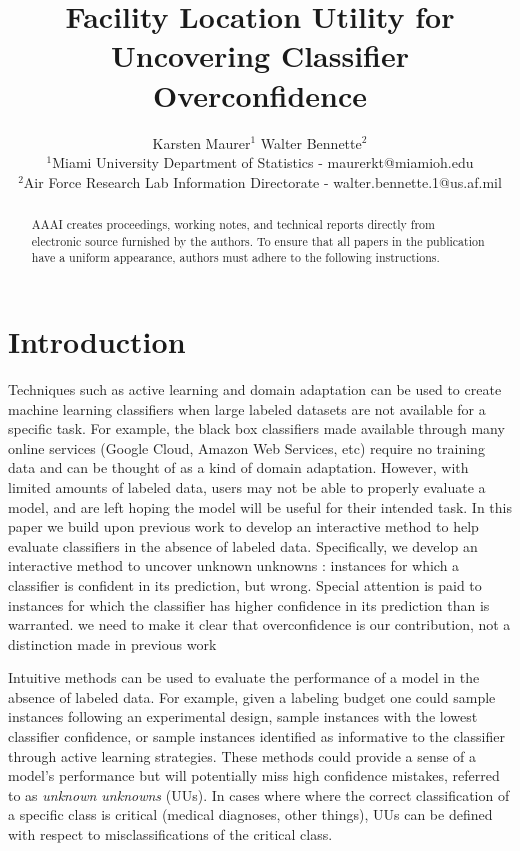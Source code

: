 \documentclass[letterpaper]{article} %
\newcommand{\km}[1]{{\color{red} #1}} %
\begin{document}
%
\title{Facility Location Utility for Uncovering Classifier Overconfidence}
\author{Karsten Maurer$^1$ \hspace{.2in} Walter Bennette$^2$\\
$^1$Miami University Department of Statistics - maurerkt@miamioh.edu\\ 
$^2$Air Force Research Lab Information Directorate - walter.bennette.1@us.af.mil \\
}

\maketitle
\begin{abstract}
AAAI creates proceedings, working notes, and technical reports directly from electronic source furnished by the authors. To ensure that all papers in the publication have a uniform appearance, authors must adhere to the following instructions. 
\end{abstract}

\section{Introduction}

Techniques such as active learning \citep{Settles2010} and domain adaptation \citep{Patel2014} can be used to create machine learning classifiers when large labeled datasets are not available for a specific task.  For example, the black box classifiers made available through many online services (Google Cloud, Amazon Web Services, etc) require no training data and can be thought of as a kind of domain adaptation.  However, with limited amounts of labeled data, users may not be able to properly evaluate a model, and are left hoping the model will be useful for their intended task.  In this paper we build upon previous work to develop an interactive method to help evaluate classifiers in the absence of labeled data.  Specifically, we develop an interactive method to uncover unknown unknowns \citep{Attenberg2015}: instances for which a classifier is confident in its prediction, but wrong.  Special attention is paid to instances for which the classifier has higher confidence in its prediction than is warranted. \km{we need to make it clear that overconfidence is our contribution, not a distinction made in previous work}

Intuitive methods can be used to evaluate the performance of a model in the absence of labeled data.  For example, given a labeling budget one could sample instances following an experimental design, sample instances with the lowest classifier confidence, or sample instances identified as informative to the classifier through active learning strategies.  These methods could provide a sense of a model's performance but will potentially miss high confidence mistakes, referred to as \textit{unknown unknowns} (UUs). In cases where where the correct classification of a specific class is critical (medical diagnoses, \km{other things}), UUs can be defined with respect to misclassifications of the critical class. 
\end{document}
